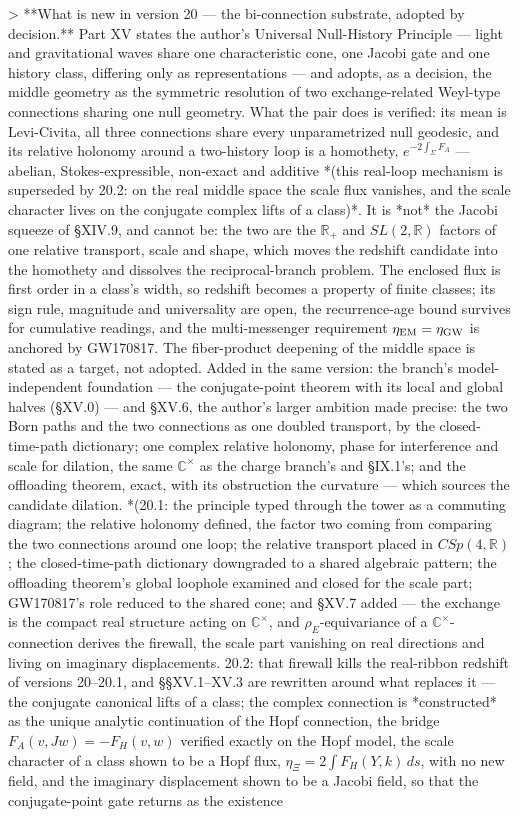 > **What is new in version 20 — the bi-connection substrate, adopted by decision.** Part XV states the author's Universal Null-History Principle — light and gravitational waves share one characteristic cone, one Jacobi gate and one history class, differing only as representations — and adopts, as a decision, the middle geometry as the symmetric resolution of two exchange-related Weyl-type connections sharing one null geometry. What the pair does is verified: its mean is Levi-Civita, all three connections share every unparametrized null geodesic, and its relative holonomy around a two-history loop is a homothety, $e^{-2\int_\Sigma F_A}$ — abelian, Stokes-expressible, non-exact and additive *(this real-loop mechanism is superseded by 20.2: on the real middle space the scale flux vanishes, and the scale character lives on the conjugate complex lifts of a class)*. It is *not* the Jacobi squeeze of §XIV.9, and cannot be: the two are the $\mathbb R_+$ and $SL(2,\mathbb R)$ factors of one relative transport, scale and shape, which moves the redshift candidate into the homothety and dissolves the reciprocal-branch problem. The enclosed flux is first order in a class's width, so redshift becomes a property of finite classes; its sign rule, magnitude and universality are open, the recurrence-age bound survives for cumulative readings, and the multi-messenger requirement $\eta_{\rm EM} = \eta_{\rm GW}$ is anchored by GW170817. The fiber-product deepening of the middle space is stated as a target, not adopted. Added in the same version: the branch's model-independent foundation — the conjugate-point theorem with its local and global halves (§XV.0) — and §XV.6, the author's larger ambition made precise: the two Born paths and the two connections as one doubled transport, by the closed-time-path dictionary; one complex relative holonomy, phase for interference and scale for dilation, the same $\mathbb C^\times$ as the charge branch's and §IX.1's; and the offloading theorem, exact, with its obstruction the curvature — which sources the candidate dilation. *(20.1: the principle typed through the tower as a commuting diagram; the relative holonomy defined, the factor two coming from comparing the two connections around one loop; the relative transport placed in $CSp(4,\mathbb R)$; the closed-time-path dictionary downgraded to a shared algebraic pattern; the offloading theorem's global loophole examined and closed for the scale part; GW170817's role reduced to the shared cone; and §XV.7 added — the exchange is the compact real structure acting on $\mathbb C^\times$, and $\rho_E$-equivariance of a $\mathbb C^\times$-connection derives the firewall, the scale part vanishing on real directions and living on imaginary displacements. 20.2: that firewall kills the real-ribbon redshift of versions 20–20.1, and §§XV.1–XV.3 are rewritten around what replaces it — the conjugate canonical lifts of a class; the complex connection is *constructed* as the unique analytic continuation of the Hopf connection, the bridge $F_A(v,Jw) = -F_H(v,w)$ verified exactly on the Hopf model, the scale character of a class shown to be a Hopf flux, $\eta_\Xi = 2\int F_H(Y,k)\,ds$, with no new field, and the imaginary displacement shown to be a Jacobi field, so that the conjugate-point gate returns as the existence 